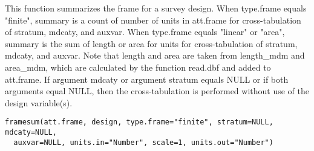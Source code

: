 \begin{Description}\relax
This function summarizes the frame for a survey design.  When type.frame
equals "finite", summary is a count of number of units in att.frame for
cross-tabulation of stratum, mdcaty, and auxvar.  When type.frame equals
"linear" or "area", summary is the sum of length or area for units for
cross-tabulation of stratum, mdcaty, and auxvar.  Note that length and area
are taken from length\_mdm and area\_mdm, which are calculated by the function
read.dbf and added to att.frame.  If argument mdcaty or argument stratum
equals NULL or if both arguments equal NULL, then the cross-tabulation is
performed without use of the design variable(s).
\end{Description}
\begin{Usage}
\begin{verbatim}
framesum(att.frame, design, type.frame="finite", stratum=NULL, mdcaty=NULL,
  auxvar=NULL, units.in="Number", scale=1, units.out="Number")
\end{verbatim}
\end{Usage}
